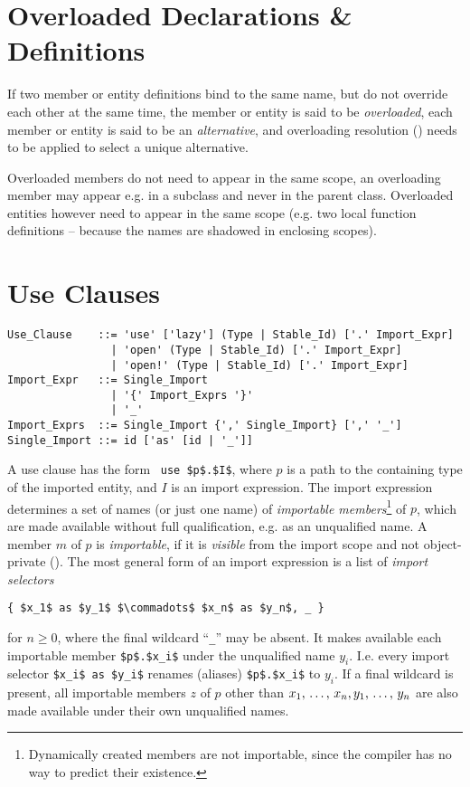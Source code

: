\section{Overloaded Declarations \& Definitions}
\label{sec:overloaded-definitions}

If two member or entity definitions bind to the same name, but do not override each other at the same time, the member or entity is said to be {\em overloaded}, each member or entity is said to be an {\em alternative}, and overloading resolution () needs to be applied to select a unique alternative. 

Overloaded members do not need to appear in the same scope, an overloading member may appear e.g. in a subclass and never in the parent class. Overloaded entities however need to appear in the same scope (e.g. two local function definitions -- because the names are shadowed in enclosing scopes). 





\section{Use Clauses}
\label{sec:use-clauses}

\grammar\begin{lstlisting}
Use_Clause    ::= 'use' ['lazy'] (Type | Stable_Id) ['.' Import_Expr]
                | 'open' (Type | Stable_Id) ['.' Import_Expr]
                | 'open!' (Type | Stable_Id) ['.' Import_Expr]
Import_Expr   ::= Single_Import
                | '{' Import_Exprs '}'
                | '_'
Import_Exprs  ::= Single_Import {',' Single_Import} [',' '_']
Single_Import ::= id ['as' [id | '_']]
\end{lstlisting}

A use clause has the form ~\lstinline!use $p$.$I$!, where $p$ is a path to the containing type of the imported entity, and $I$ is an import expression. The import expression determines a set of names (or just one name) of {\em importable members}\footnote{Dynamically created members are not importable, since the compiler has no way to predict their existence.} of $p$, which are made available without full qualification, e.g. as an unqualified name. A member $m$ of $p$ is {\em importable}, if it is {\em visible} from the import scope and not object-private (). The most general form of an import expression is a list of {\em import selectors}
\begin{lstlisting}
{ $x_1$ as $y_1$ $\commadots$ $x_n$ as $y_n$, _ }
\end{lstlisting}
for $n \ge 0$, where the final wildcard ``\lstinline!_!'' may be absent. It makes available each importable member \lstinline!$p$.$x_i$! under the unqualified name $y_i$. I.e. every import selector \lstinline!$x_i$ as $y_i$! renames (aliases) \lstinline!$p$.$x_i$! to $y_i$. If a final wildcard is present, all importable members $z$ of $p$ other than $x_1 ,\, \ldots ,\, x_n, y_1 ,\, \ldots ,\, y_n$ are also made available under their own unqualified names. 

